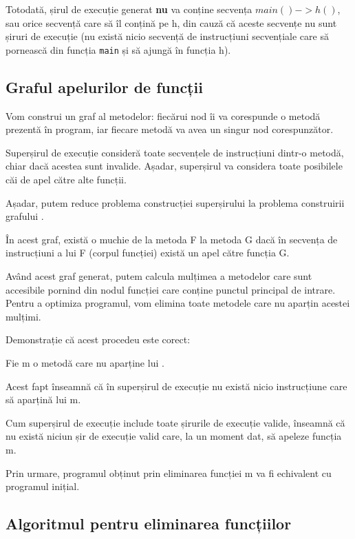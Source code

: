 Totodată, șirul de execuție generat \textbf{nu} va conține
secvența \(main() -> h()\), sau orice secvență care să îl conțină
pe h, din cauză că aceste secvențe nu sunt șiruri de execuție
(nu există nicio secvență de instrucțiuni secvențiale
care să pornească din funcția \texttt{main} și să ajungă în
funcția h).

\subsection{Graful apelurilor de funcții}\label{graful_apelurilor}

Vom construi un graf  al metodelor: fiecărui nod îi va
corespunde o metodă prezentă în program, iar fiecare metodă va
avea un singur nod corespunzător.

Superșirul de execuție consideră toate secvențele de instrucțiuni
dintr-o metodă, chiar dacă acestea sunt invalide.
Așadar, superșirul va considera toate  posibilele căi de apel către alte funcții.

Așadar, putem reduce problema construcției superșirului la
problema construirii grafului .

În acest graf, există o muchie de la metoda F la metoda
G dacă în secvența de instrucțiuni a lui F (corpul funcției)
există un apel către funcția G.

Având acest graf generat, putem calcula mulțimea  a metodelor
care sunt accesibile pornind din nodul funcției care
conține punctul principal de intrare.
Pentru a optimiza programul, vom elimina toate metodele care nu
aparțin acestei mulțimi.

Demonstrație că acest procedeu este corect:
\begin{lemma}

	Fie m o metodă care nu aparține lui .

	Acest fapt înseamnă că în superșirul de execuție nu există nicio
	instrucțiune care să aparțină lui m.

	Cum superșirul de execuție include toate șirurile de execuție
	valide, înseamnă că nu există niciun șir de execuție valid care,
	la un moment dat, să apeleze funcția m.

	Prin urmare, programul obținut prin eliminarea funcției m va fi
	echivalent cu programul inițial.
\end{lemma}

\subsection{Algoritmul pentru eliminarea
funcțiilor}\label{algoritm_naiv_pentru_eliminare}

